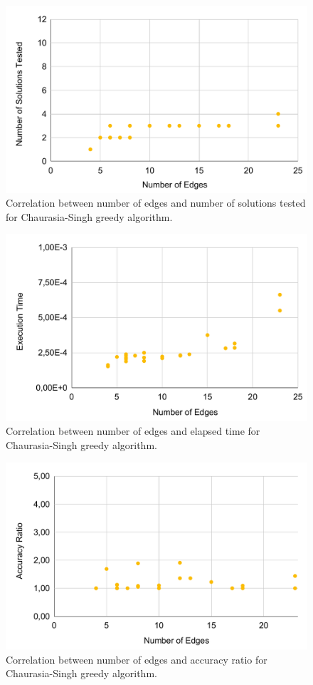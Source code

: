 \begin{figure}[!ht]
    \centering
    \includegraphics[width=0.9\linewidth]{figs/chaurasia-solutions.pdf}
    \caption{Correlation between number of edges and number of solutions tested for Chaurasia-Singh greedy algorithm.}
    \label{fig:chaurasia-sol}
\end{figure}


\begin{figure}[!ht]
    \centering
    \includegraphics[width=0.9\linewidth]{figs/chaurasia-time.pdf}
    \caption{Correlation between number of edges and elapsed time for Chaurasia-Singh greedy algorithm.}
    \label{fig:chaurasia-time}
\end{figure}

\newpage

\begin{figure}[!ht]
    \centering
    \includegraphics[width=0.9\linewidth]{figs/chaurasia-ratio.pdf}
    \caption{Correlation between number of edges and accuracy ratio for Chaurasia-Singh greedy algorithm.}
    \label{fig:chaurasia-ratio}
\end{figure}